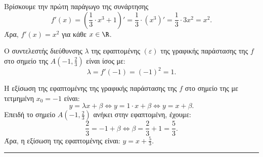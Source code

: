 \begin{alist}
    \item Βρίσκουμε την πρώτη παράγωγο της συνάρτησης
    \[
        f'(x) = \left(\frac{1}{3} \cdot x^3 + 1\right)' = \frac{1}{3} \cdot (x^3)' = \frac{1}{3} \cdot 3x^2 = x^2.
    \]
    Άρα, $f'(x) = x^2$ για κάθε $x \in \R$.

    \item Ο συντελεστής διεύθυνσης $\lambda$ της εφαπτομένης $(\varepsilon)$ της γραφικής παράστασης της $f$ στο σημείο της $A\left(-1, \frac{2}{3}\right)$ είναι ίσος με:
    \[
        \lambda = f'(-1) = (-1)^2 = 1.
    \]

    \item Η εξίσωση της εφαπτομένης της γραφικής παράστασης της $f$ στο σημείο της με τετμημένη $x_0 = -1$ είναι:
    \[
        y = \lambda x + \beta \Leftrightarrow y = 1 \cdot x + \beta \Leftrightarrow y = x + \beta.
    \]
    Επειδή το σημείο $A\left(-1, \frac{2}{3}\right)$ ανήκει στην εφαπτομένη, έχουμε:
    \[
        \frac{2}{3} = -1 + \beta \Leftrightarrow \beta = \frac{2}{3} + 1 = \frac{5}{3}.
    \]
    Άρα, η εξίσωση της εφαπτομένης είναι: $y = x + \frac{5}{3}.$
\end{alist}
\vspace{6mm}
\noindent\rule{\textwidth}{0.4pt}
\vspace{6mm}

